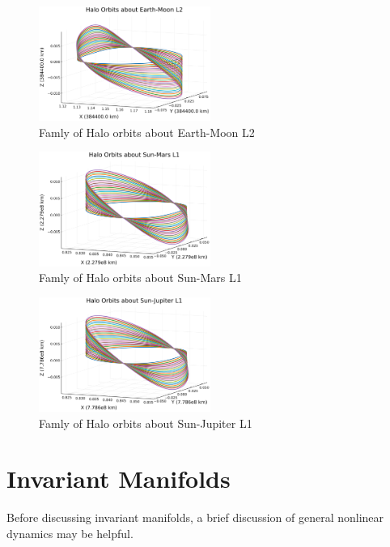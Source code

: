 \documentclass[conf]{new-aiaa}
\begin{document}
\newpage
\begin{multicols}{2}

\begin{figure}[H]
    \hskip -0.3cm
    \includegraphics[width=0.5\textwidth]{halo_family.png}
    \caption{Famly of Halo orbits about Earth-Moon L2}
\end{figure}

\begin{figure}[H]
    \hskip -0.3cm
    \includegraphics[width=0.5\textwidth]{halo_family_sm1.png}
    \caption{Famly of Halo orbits about Sun-Mars L1}
\end{figure}

\begin{figure}[H]
    \hskip -0.3cm
    \includegraphics[width=0.5\textwidth]{halo_family_sj1.png}
    \caption{Famly of Halo orbits about Sun-Jupiter L1}
\end{figure}

\section{Invariant Manifolds}

Before discussing invariant manifolds, a brief discussion of 
general nonlinear dynamics may be helpful. 


\end{multicols}
\end{document}
